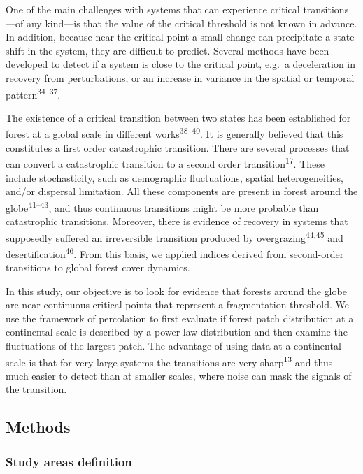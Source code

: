 \documentclass[]{article}
\begin{document}
One of the main challenges with systems that can experience critical
transitions---of any kind---is that the value of the critical threshold
is not known in advance. In addition, because near the critical point a
small change can precipitate a state shift in the system, they are
difficult to predict. Several methods have been developed to detect if a
system is close to the critical point, e.g.~a deceleration in recovery
from perturbations, or an increase in variance in the spatial or
temporal pattern\textsuperscript{34--37}.

The existence of a critical transition between two states has been
established for forest at a global scale in different
works\textsuperscript{38--40}. It is generally believed that this
constitutes a first order catastrophic transition. There are several
processes that can convert a catastrophic transition to a second order
transition\textsuperscript{17}. These include stochasticity, such as
demographic fluctuations, spatial heterogeneities, and/or dispersal
limitation. All these components are present in forest around the
globe\textsuperscript{41--43}, and thus continuous transitions might be
more probable than catastrophic transitions. Moreover, there is evidence
of recovery in systems that supposedly suffered an irreversible
transition produced by overgrazing\textsuperscript{44,45} and
desertification\textsuperscript{46}. From this basis, we applied indices
derived from second-order transitions to global forest cover dynamics.

In this study, our objective is to look for evidence that forests around
the globe are near continuous critical points that represent a
fragmentation threshold. We use the framework of percolation to first
evaluate if forest patch distribution at a continental scale is
described by a power law distribution and then examine the fluctuations
of the largest patch. The advantage of using data at a continental scale
is that for very large systems the transitions are very
sharp\textsuperscript{13} and thus much easier to detect than at smaller
scales, where noise can mask the signals of the transition.

\subsection{Methods}\label{methods}

\subsubsection{Study areas definition}\label{study-areas-definition}
\end{document}
